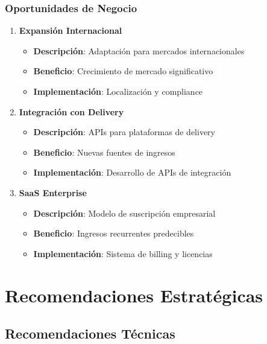 \documentclass[12pt,a4paper]{article}
\begin{document}
\subsubsection{Oportunidades de Negocio}
\begin{enumerate}
    \item \textbf{Expansión Internacional}
    \begin{itemize}
        \item \textbf{Descripción}: Adaptación para mercados internacionales
        \item \textbf{Beneficio}: Crecimiento de mercado significativo
        \item \textbf{Implementación}: Localización y compliance
    \end{itemize}
    
    \item \textbf{Integración con Delivery}
    \begin{itemize}
        \item \textbf{Descripción}: APIs para plataformas de delivery
        \item \textbf{Beneficio}: Nuevas fuentes de ingresos
        \item \textbf{Implementación}: Desarrollo de APIs de integración
    \end{itemize}
    
    \item \textbf{SaaS Enterprise}
    \begin{itemize}
        \item \textbf{Descripción}: Modelo de suscripción empresarial
        \item \textbf{Beneficio}: Ingresos recurrentes predecibles
        \item \textbf{Implementación}: Sistema de billing y licencias
    \end{itemize}
\end{enumerate}

\section{Recomendaciones Estratégicas}

\subsection{Recomendaciones Técnicas}
\end{document}
